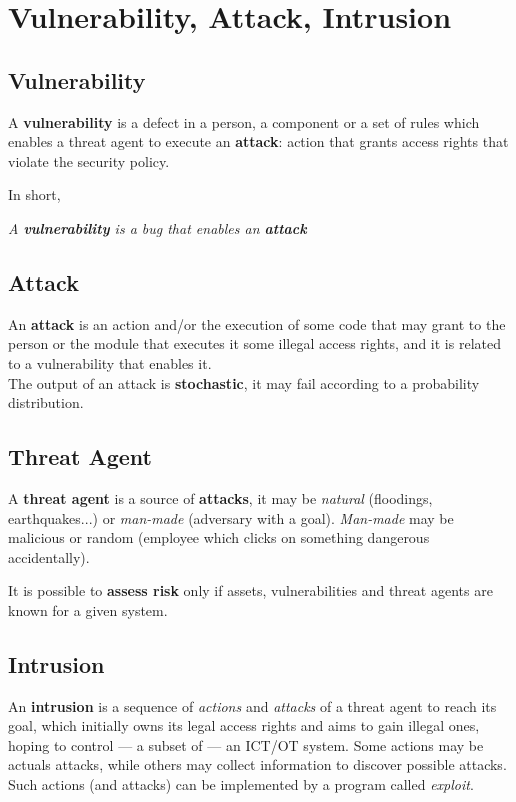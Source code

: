 \chapter{Vulnerability, Attack, Intrusion}
\section{Vulnerability}
A \textbf{vulnerability} is a defect in a person, a component or a set of rules which enables a threat agent to execute an \textbf{attack}:
action that grants access rights that violate the security policy.

In short,
\begin{center}
    \textit{A \textbf{vulnerability} is a bug that enables an \textbf{attack}}
\end{center}


\section{Attack}
An \textbf{attack} is an action and/or the execution of some code that may grant to the person or the module that executes it some illegal access rights, and it is related to a vulnerability that enables it.\\
The output of an attack is \textbf{stochastic}, it may fail according to a probability distribution.


\section{Threat Agent}
A \textbf{threat agent} is a source of \textbf{attacks},
it may be \textit{natural} (floodings, earthquakes...) or \textit{man-made }(adversary with a goal).
\textit{Man-made} may be malicious or random (employee which clicks on something dangerous accidentally).

\begin{center}
    It is possible to \textbf{assess risk} only if assets, vulnerabilities and threat agents are known for a given system. 
\end{center}

\section{Intrusion}
An \textbf{intrusion} is a sequence of \textit{actions} and \textit{attacks} of a threat agent to reach its goal,
which initially owns its legal access rights and aims to gain illegal ones,
hoping to control {---} a subset of {---} an ICT/OT system.
Some actions may be actuals attacks, while others may collect information to discover possible attacks.
Such actions (and attacks) can be implemented by a program called \textit{exploit}.

